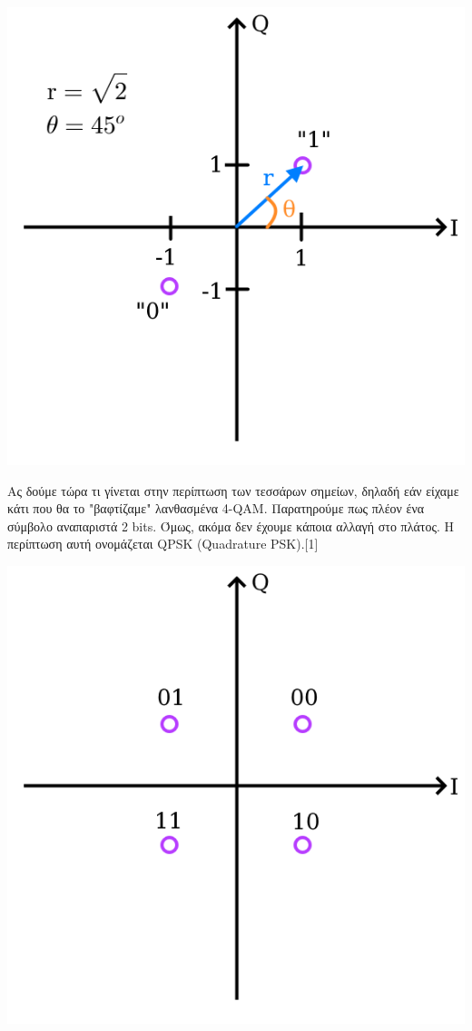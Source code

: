 \documentclass{article}
\begin{document}
\begin{center}
    \includegraphics[scale=0.6]{diktya_pic3.png}
\end{center}
Ας δούμε τώρα τι γίνεται στην περίπτωση των τεσσάρων σημείων, δηλαδή εάν είχαμε κάτι που θα το "βαφτίζαμε" λανθασμένα 4-QAM.
Παρατηρούμε πως πλέον ένα σύμβολο αναπαριστά 2 bits. Όμως, ακόμα δεν έχουμε κάποια αλλαγή στο πλάτος. Η περίπτωση αυτή ονομάζεται QPSK (Quadrature PSK).[1]
\begin{center}
    \includegraphics[scale=0.6]{diktya_pic4.png}
\end{center}
\end{document}

